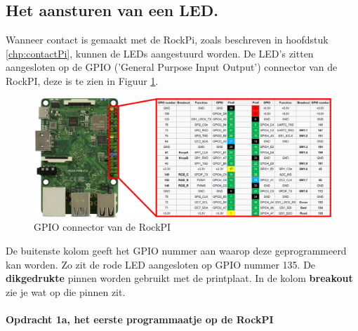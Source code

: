\subsection{Het aansturen van een LED.}
Wanneer contact is gemaakt met de RockPi, zoals beschreven in hoofdstuk \ref{chp:contactPi}, kunnen de LEDs aangestuurd worden. De LED's zitten aangesloten op de GPIO ('General Purpose Input Output') connector van de RockPI, deze is te zien in Figuur \ref{fig:rockpiCon}.
\begin{figure}[h!]
	\centering
	\begin{center} 	
		\includegraphics[width=1.1\textwidth]{figuren/rockpi-connector}
		\caption{GPIO connector van de RockPI}
		\label{fig:rockpiCon}   
	\end{center}
\end{figure}
De buitenste kolom geeft het GPIO nummer aan waarop deze geprogrammeerd kan worden. Zo zit de rode LED aangesloten op GPIO nummer 135. De \textbf{dikgedrukte} pinnen worden gebruikt met de printplaat. In de kolom \textbf{breakout} zie je wat op die pinnen zit.

\paragraph[Opdracht 1a]{Opdracht 1a, het eerste programmaatje op de RockPI}	

